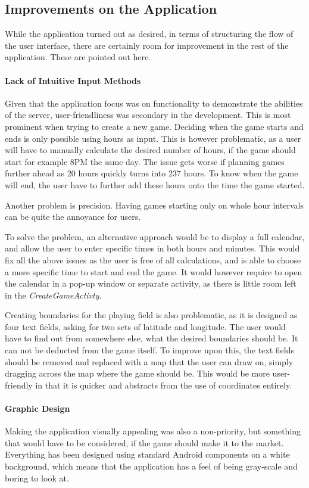 \subsection{Improvements on the Application}
While the application turned out as desired, in terms of structuring the flow of the user interface, there are certainly room for improvement in the rest of the application. These are pointed out here.

\paragraph{Lack of Intuitive Input Methods}
Given that the application focus was on functionality to demonstrate the abilities of the server, user-friendliness was secondary in the development. This is most prominent when trying to create a new game. Deciding when the game starts and ends is only possible using hours as input. This is however problematic, as a user will have to manually calculate the desired number of hours, if the game should start for example 8PM the same day. The issue gets worse if planning games further ahead as 20 hours quickly turns into 237 hours. To know when the game will end, the user have to further add these hours onto the time the game started.

Another problem is precision. Having games starting only on whole hour intervals can be quite the annoyance for users.

To solve the problem, an alternative approach would be to display a full calendar, and allow the user to enter specific times in both hours and minutes. This would fix all the above issues as the user is free of all calculations, and is able to choose a more specific time to start and end the game. It would however require to open the calendar in a pop-up window or separate activity, as there is little room left in the \textit{CreateGameActivty}.

Creating boundaries for the playing field is also problematic, as it is designed as four text fields, asking for two sets of latitude and longitude. The user would have to find out from somewhere else, what the desired boundaries should be. It can not be deducted from the game itself. To improve upon this, the text fields should be removed and replaced with a map that the user can draw on, simply dragging across the map where the game should be. This would be more user-friendly in that it is quicker and abstracts from the use of coordinates entirely.

\paragraph{Graphic Design}
Making the application visually appealing was also a non-priority, but something that would have to be considered, if the game should make it to the market. Everything has been designed using standard Android components on a white background, which means that the application has a feel of being gray-scale and boring to look at.

